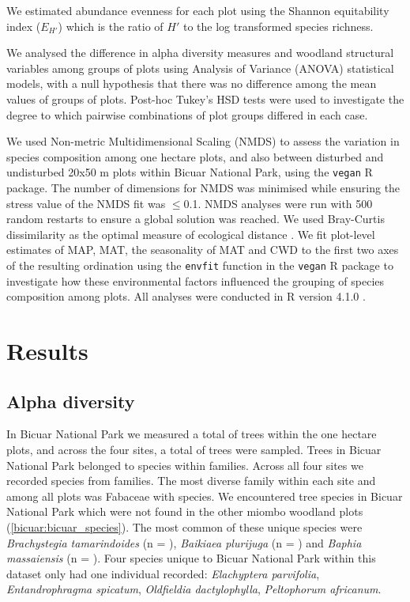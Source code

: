 \begin{refsection}
We estimated abundance evenness for each plot using the Shannon equitability index ($E_{H'}$) \citep{Smith1996} which is the ratio of $H'$ to the log transformed species richness.

We analysed the difference in alpha diversity measures and woodland structural variables among groups of plots using Analysis of Variance (ANOVA) statistical models, with a null hypothesis that there was no difference among the mean values of groups of plots. Post-hoc Tukey's HSD tests were used to investigate the degree to which pairwise combinations of plot groups differed in each case.

We used Non-metric Multidimensional Scaling (NMDS) to assess the variation in species composition among one hectare plots, and also between disturbed and undisturbed 20x50 m plots within Bicuar National Park, using the \texttt{vegan} R package. The number of dimensions for NMDS was minimised while ensuring the stress value of the NMDS fit was $\le$0.1. NMDS analyses were run with 500 random restarts to ensure a global solution was reached. We used Bray-Curtis dissimilarity as the optimal measure of ecological distance \citep{Legendre2013}. We fit plot-level estimates of MAP, MAT, the seasonality of MAT and CWD to the first two axes of the resulting ordination using the \texttt{envfit} function in the \texttt{vegan} R package to investigate how these environmental factors influenced the grouping of species composition among plots. All analyses were conducted in R version 4.1.0 \citep{R2020}.

\section{Results}
\label{bicuar:sec:results}

\subsection{Alpha diversity}
\label{bicuar:ssec:alpha}

In Bicuar National Park we measured a total of \nbicuartrees{} trees within the one hectare plots, and across the four sites,  a total of \ntrees{} trees were sampled. Trees in Bicuar National Park belonged to \nbicuarspecies{} species within \nbicuarfamilies{} families. Across all four sites we recorded \nspecies{} species from \nfamilies{} families. The most diverse family within each site and among all plots was Fabaceae with \nfabaceaespecies{} species. We encountered \nbicuaruniquespecies{} tree species in Bicuar National Park which were not found in the other miombo woodland plots (\autoref{bicuar:bicuar_species}). The most common of these unique species were \textit{Brachystegia tamarindoides} (n = \nbg{}), \textit{Baikiaea plurijuga} (n = \nbp{}) and \textit{Baphia massaiensis} (n = \nbm{}). Four species unique to Bicuar National Park within this dataset only had one individual recorded: \textit{Elachyptera parvifolia}, \textit{Entandrophragma spicatum}, \textit{Oldfieldia dactylophylla}, \textit{Peltophorum africanum}.


\end{refsection}
